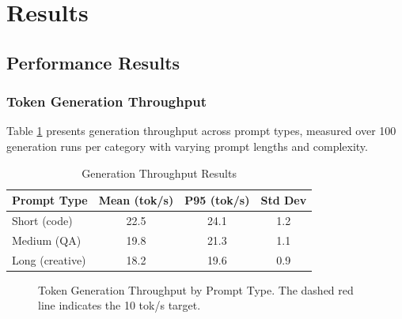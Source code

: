 \section{Results}
\label{sec:results}

\subsection{Performance Results}

\subsubsection{Token Generation Throughput}

Table \ref{tab:throughput_results} presents generation throughput across prompt types, measured over 100 generation runs per category with varying prompt lengths and complexity.

\begin{table}[h]
\centering
\caption{Generation Throughput Results}
\label{tab:throughput_results}
\begin{tabular}{lccc}
\toprule
\textbf{Prompt Type} & \textbf{Mean (tok/s)} & \textbf{P95 (tok/s)} & \textbf{Std Dev} \\
\midrule
Short (code) & 22.5 & 24.1 & 1.2 \\
Medium (QA) & 19.8 & 21.3 & 1.1 \\
Long (creative) & 18.2 & 19.6 & 0.9 \\
\bottomrule
\end{tabular}
\end{table}

\begin{figure}[h]
\centering
{}
\caption{Token Generation Throughput by Prompt Type. The dashed red line indicates the 10 tok/s target.}
\label{fig:throughput}
\end{figure}

